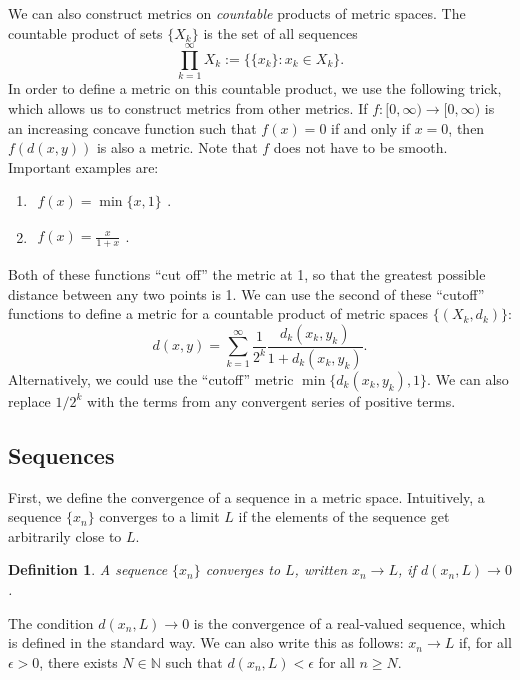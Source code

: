 \documentclass[12pt]{amsart}         %
\newtheorem{definition}{Definition}[section]
\theoremstyle{remark}
\newcommand{\N}{\mathbb{N}}
\begin{document}
We can also construct metrics on \emph{countable} products of metric spaces. The countable product of sets $\{X_k\}$ is the set of all sequences
\[
\prod_{k=1}^\infty X_k := \Big\{ \{x_k\} : x_k \in X_k \Big\}.
\]
In order to define a metric on this countable product, we use the following trick, which allows us to construct metrics from other metrics. If $f:[0, \infty) \rightarrow [0, \infty)$ is an increasing concave function such that $f(x)=0$ if and only if $x=0$, then $f(d(x,y))$ is also a metric. Note that $f$ does not have to be smooth. Important examples are:
\begin{enumerate}
    \item $\begin{aligned}f(x) = \min\{x, 1\}\end{aligned}$.
    \item $\begin{aligned}f(x) = \frac{x}{1+x}\end{aligned}$.
\end{enumerate}
Both of these functions ``cut off'' the metric at 1, so that the greatest possible distance between any two points is 1. We can use the second of these ``cutoff'' functions to define a metric for a countable product of metric spaces $\{(X_k, d_k)\}$:
\[
d(x,y) = \sum_{k = 1}^\infty \frac{1}{2^k} \frac{d_k(x_k, y_k)}{1+d_k(x_k, y_k)}.
\]
Alternatively, we could use the ``cutoff'' metric $\min\{d_k(x_k, y_k), 1\}$. We can also replace $1/2^k$ with the terms from any convergent series of positive terms.

\subsection{Sequences}

First, we define the convergence of a sequence in a metric space. Intuitively, a sequence $\{x_n\}$ converges to a limit $L$ if the elements of the sequence get arbitrarily close to $L$.
\begin{definition}
A sequence $\{x_n\}$ \emph{converges} to $L$, written $x_n \rightarrow L$, if $d(x_n, L) \rightarrow 0$.
\end{definition}
The condition $d(x_n, L) \rightarrow 0$ is the convergence of a real-valued sequence, which is defined in the standard way. We can also write this as follows: $x_n \rightarrow L$ if, for all $\epsilon > 0$, there exists $N \in \N$ such that $d(x_n, L) < \epsilon$ for all $n \geq N$. 
\end{document}
